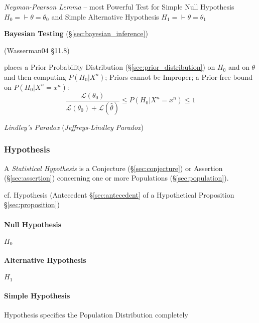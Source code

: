\emph{Neyman-Pearson Lemma} -- most Powerful Test for Simple Null Hypothesis
$H_0 = \vdash \theta = \theta_0$ and Simple Alternative Hypothesis
$H_1 = \vdash \theta = \theta_1$

\asterism

\textbf{Bayesian Testing} (\S\ref{sec:bayesian_inference})

(Wasserman04 \S11.8)

places a Prior Probability Distribution (\S\ref{sec:prior_distribution}) on
$H_0$ and on $\theta$ and then computing $P(H_0 | X^n)$; Priors cannot be
Improper; a Prior-free bound on $P(H_0|X^n = x^n)$:
\[
  \frac{\mathcal{L}(\theta_0)}{\mathcal{L}(\theta_0) + \mathcal{L}(\hat\theta)}
    \leq P(H_0|X^n = x^n) \leq 1
\]

\emph{Lindley's Paradox} (\emph{Jeffreys-Lindley Paradox})



\subsubsection{Hypothesis}\label{sec:hypothesis}

A \emph{Statistical Hypothesis} is a Conjecture (\S\ref{sec:conjecture}) or
Assertion (\S\ref{sec:assertion}) concerning one or more Populations
(\S\ref{sec:population}).

cf. Hypothesis (Antecedent \S\ref{sec:antecedent} of a Hypothetical Proposition
\S\ref{sec:proposition})



\paragraph{Null Hypothesis}\label{sec:null_hypothesis}\hfill

$H_0$



\paragraph{Alternative Hypothesis}\label{sec:alternative_hypothesis}\hfill

$H_1$



\paragraph{Simple Hypothesis}\label{sec:simple_hypothesis}\hfill

Hypothesis specifies the Population Distribution completely

